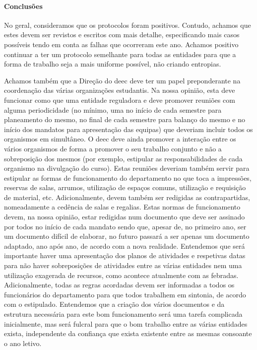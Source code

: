 \paragraph{Conclusões}

No geral, consideramos que os protocolos foram positivos. Contudo, achamos que estes devem ser revistos e escritos com mais detalhe, especificando mais casos possíveis tendo em conta as falhas que ocorreram este ano. Achamos positivo continuar a ter um protocolo semelhante para todas as entidades para que a forma de trabalho seja a mais uniforme possível, não criando entropias.

Achamos também que a Direção do \acrshort{deec} deve ter um papel preponderante na coordenação das várias organizações estudantis. Na nossa opinião, esta deve funcionar como que uma entidade reguladora e deve promover reuniões com alguma periodicidade (no mínimo, uma no início de cada semestre para planeamento do mesmo, no final de cada semestre para balanço do mesmo e no início dos mandatos para apresentação das equipas) que deveriam incluir todos os organismos em simultâneo. O \acrshort{deec} deve ainda promover a interação entre os vários organismos de forma a promover o seu trabalho conjunto e não a sobreposição dos mesmos (por exemplo, estipular as responsabilidades de cada organismo na divulgação do curso). Estas reuniões deveriam também servir para estipular as formas de funcionamento do departamento no que toca a impressões, reservas de salas, arrumos, utilização de espaços comuns, utilização e requisição de material, etc. Adicionalmente, devem também ser redigidas as contrapartidas, nomeadamente a cedência de salas e regalias. Estas normas de funcionamento devem, na nossa opinião, estar redigidas num documento que deve ser assinado por todos no início de cada mandato sendo que, apesar de, no primeiro ano, ser um documento difícil de elaborar, no futuro passará a ser apenas um documento adaptado, ano após ano, de acordo com a nova realidade. Entendemos que será importante haver uma apresentação dos planos de atividades e respetivas datas para não haver sobreposições de atividades entre as várias entidades nem uma utilização exagerada de recursos, como acontece atualmente com as febradas. Adicionalmente, todas as regras acordadas devem ser informadas a todos os funcionários do departamento para que todos trabalhem em sintonia, de acordo com o estipulado. Entendemos que a criação dos vários documentos e da estrutura necessária para este bom funcionamento será uma tarefa complicada inicialmente, mas será fulcral para que o bom trabalho entre as várias entidades exista, independente da confiança que exista existente entre as mesmas consoante o ano letivo.

